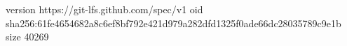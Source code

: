 version https://git-lfs.github.com/spec/v1
oid sha256:61fe4654682a8c6ef8bf792e421d979a282dfd1325f0ade66dc28035789c9e1b
size 40269
